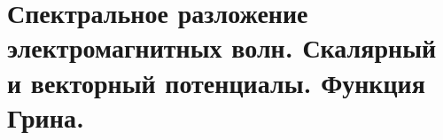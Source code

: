 \chapter{Спектральное разложение электромагнитных волн. Скалярный 
и векторный потенциалы. Функция Грина.}

\section{}
\section{}
